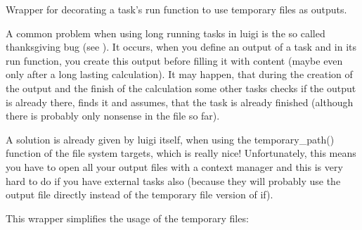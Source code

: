\documentclass[letterpaper,10pt,english]{sphinxmanual}
\begin{document}
\begin{fulllineitems}
\label{\detokenize{documentation/api:b2luigi.on_temporary_files}}
Wrapper for decorating a task’s run function to use temporary files as outputs.

A common problem when using long running tasks in luigi is the so called thanksgiving bug
(see ).
It occurs, when you define an output of a task and in its run function,
you create this output before filling it with content
(maybe even only after a long lasting calculation).
It may happen, that during the creation of the output and the finish of the calculation
some other tasks checks if the output is already there, finds it and assumes,
that the task is already finished (although there is probably only non\sphinxhyphen{}sense in the file
so far).

A solution is already given by luigi itself, when using the temporary\_path() function
of the file system targets, which is really nice!
Unfortunately, this means you have to open all your output files with a context manager
and this is very hard to do if you have external tasks also (because they will
probably use the output file directly instead of the temporary file version of if).

This wrapper simplifies the usage of the temporary files:

\begin{sphinxVerbatim}[commandchars=\\\{\}]
 

 
     
         

     
            
             
\end{sphinxVerbatim}


\end{fulllineitems}
\end{document}
